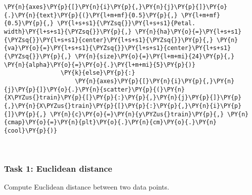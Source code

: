 \begin{Verbatim}[commandchars=\\\{\}]
                    \PY{n}{axes}\PY{p}{[}\PY{n}{i}\PY{p}{,}\PY{n}{j}\PY{p}{]}\PY{o}{.}\PY{n}{text}\PY{p}{(}\PY{l+m+mf}{0.5}\PY{p}{,} \PY{l+m+mf}{0.5}\PY{p}{,} \PY{l+s+s1}{\PYZsq{}}\PY{l+s+s1}{Petal. width}\PY{l+s+s1}{\PYZsq{}}\PY{p}{,} \PY{n}{ha}\PY{o}{=}\PY{l+s+s1}{\PYZsq{}}\PY{l+s+s1}{center}\PY{l+s+s1}{\PYZsq{}}\PY{p}{,} \PY{n}{va}\PY{o}{=}\PY{l+s+s1}{\PYZsq{}}\PY{l+s+s1}{center}\PY{l+s+s1}{\PYZsq{}}\PY{p}{,} \PY{n}{size}\PY{o}{=}\PY{l+m+mi}{24}\PY{p}{,} \PY{n}{alpha}\PY{o}{=}\PY{o}{.}\PY{l+m+mi}{5}\PY{p}{)}
                \PY{k}{else}\PY{p}{:}
                    \PY{n}{axes}\PY{p}{[}\PY{n}{i}\PY{p}{,}\PY{n}{j}\PY{p}{]}\PY{o}{.}\PY{n}{scatter}\PY{p}{(}\PY{n}{X\PYZus{}train}\PY{p}{[}\PY{p}{:}\PY{p}{,}\PY{n}{j}\PY{p}{]}\PY{p}{,}\PY{n}{X\PYZus{}train}\PY{p}{[}\PY{p}{:}\PY{p}{,}\PY{n}{i}\PY{p}{]}\PY{p}{,} \PY{n}{c}\PY{o}{=}\PY{n}{y\PYZus{}train}\PY{p}{,} \PY{n}{cmap}\PY{o}{=}\PY{n}{plt}\PY{o}{.}\PY{n}{cm}\PY{o}{.}\PY{n}{cool}\PY{p}{)}
\end{Verbatim}

    \begin{center}
    \end{center}
    { \hspace*{\fill} \\}
    
    \hypertarget{task-1-euclidean-distance}{%
\subsubsection{Task 1: Euclidean
distance}\label{task-1-euclidean-distance}}

Compute Euclidean distance between two data points.

